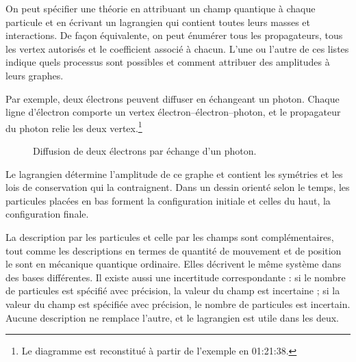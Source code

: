 On peut spécifier une théorie en attribuant un champ quantique à chaque particule et en écrivant un lagrangien qui contient toutes leurs masses et interactions. De façon équivalente, on peut énumérer tous les propagateurs, tous les vertex autorisés et le coefficient associé à chacun. L’une ou l’autre de ces listes indique quels processus sont possibles et comment attribuer des amplitudes à leurs graphes.

Par exemple, deux électrons peuvent diffuser en échangeant un photon. Chaque ligne d’électron comporte un vertex électron--électron--photon, et le propagateur du photon relie les deux vertex.\footnote{Le diagramme est reconstitué à partir de l’exemple en 01:21:38.}

\begin{figure}[htbp]
\centering
{}
\caption{Diffusion de deux électrons par échange d’un photon.}
\end{figure}

Le lagrangien détermine l’amplitude de ce graphe et contient les symétries et les lois de conservation qui la contraignent. Dans un dessin orienté selon le temps, les particules placées en bas forment la configuration initiale et celles du haut, la configuration finale.

\begin{classroomqa}
\end{classroomqa}

La description par les particules et celle par les champs sont complémentaires, tout comme les descriptions en termes de quantité de mouvement et de position le sont en mécanique quantique ordinaire. Elles décrivent le même système dans des bases différentes. Il existe aussi une incertitude correspondante : si le nombre de particules est spécifié avec précision, la valeur du champ est incertaine ; si la valeur du champ est spécifiée avec précision, le nombre de particules est incertain. Aucune description ne remplace l’autre, et le lagrangien est utile dans les deux.

